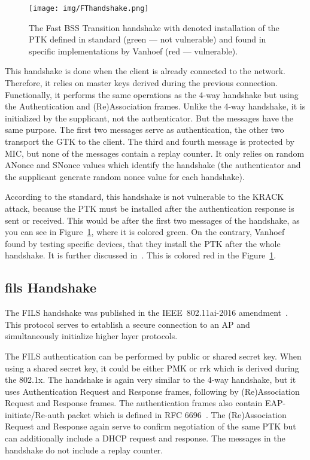 \begin{figure}[h!]
  \centering
  \texttt{[image: img/FThandshake.png]}
  \caption[The Fast BSS Transition handshake]{The Fast BSS Transition handshake with denoted installation of the PTK defined in standard (green --- not vulnerable) and found in specific implementations by Vanhoef (red --- vulnerable).}
  \label{fig:ftHandshake}
\end{figure}

This handshake is done when the client is already connected to the network. Therefore, it relies on master keys derived during the previous connection. Functionally, it performs the same operations as the 4-way handshake but using the Authentication and (Re)Association frames. Unlike the 4-way handshake, it is initialized by the supplicant, not the authenticator. But the messages have the same purpose. The first two messages serve as authentication, the other two transport the GTK to the client. The third and fourth message is protected by MIC, but none of the messages contain a replay counter. It only relies on random ANonce and SNonce values which identify the handshake (the authenticator and the supplicant generate random nonce value for each handshake).  

According to the standard, this handshake is not vulnerable to the KRACK attack, because the PTK must be installed after the authentication response is sent or received. This would be after the first two messages of the handshake, as you can see in Figure~\ref{fig:ftHandshake}, where it is colored green. On the contrary, Vanhoef found by testing specific devices, that they install the PTK after the whole handshake. It is further discussed in~\cite{VA_ccs2017}. This is colored red in the Figure~\ref{fig:ftHandshake}.

\subsection{\gls{fils} Handshake}

The FILS handshake was published in the IEEE~802.11ai-2016 amendment~\cite{IEEE802_11ai_2016}. This protocol serves to establish a secure connection to an AP and simultaneously initialize higher layer protocols.

The FILS authentication can be performed by public or shared secret key. When using a shared secret key, it could be either PMK or \gls{rrk} which is derived during the 802.1x. The handshake is again very similar to the 4-way handshake, but it uses Authentication Request and Response frames, following by (Re)Association Request and Response frames. The authentication frames also contain EAP-initiate/Re-auth packet which is defined in RFC 6696~\cite{RFC6696}. The (Re)Association Request and Response again serve to confirm negotiation of the same PTK but can additionally include a DHCP request and response. The messages in the handshake do not include a replay counter. 

